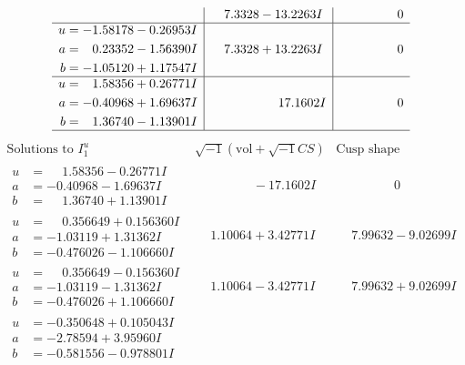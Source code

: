 \documentclass[1p]{elsarticle_modified}
\theoremstyle{definition}
\newcommand{\I}{\sqrt{-1}}
\begin{document}
$$\begin{array}{c|c|c}
 & \phantom{-}7.3328 - 13.2263 I & \phantom{-0.000000 } 0 \\ \hline\begin{aligned}
u &= -1.58178 - 0.26953 I \\
a &= \phantom{-}0.23352 - 1.56390 I \\
b &= -1.05120 + 1.17547 I\end{aligned}
 & \phantom{-}7.3328 + 13.2263 I & \phantom{-0.000000 } 0 \\ \hline\begin{aligned}
u &= \phantom{-}1.58356 + 0.26771 I \\
a &= -0.40968 + 1.69637 I \\
b &= \phantom{-}1.36740 - 1.13901 I\end{aligned}
 & \phantom{-0.000000 -}17.1602 I & \phantom{-0.000000 } 0\\
 \hline 
 \end{array}$$\newpage$$\begin{array}{c|c|c}  
\text{Solutions to }I^u_{1}& \I (\text{vol} + \sqrt{-1}CS) & \text{Cusp shape}\\
 \hline 
\begin{aligned}
u &= \phantom{-}1.58356 - 0.26771 I \\
a &= -0.40968 - 1.69637 I \\
b &= \phantom{-}1.36740 + 1.13901 I\end{aligned}
 & \phantom{-0.000000 } -17.1602 I & \phantom{-0.000000 } 0 \\ \hline\begin{aligned}
u &= \phantom{-}0.356649 + 0.156360 I \\
a &= -1.03119 + 1.31362 I \\
b &= -0.476026 - 1.106660 I\end{aligned}
 & \phantom{-}1.10064 + 3.42771 I & \phantom{-}7.99632 - 9.02699 I \\ \hline\begin{aligned}
u &= \phantom{-}0.356649 - 0.156360 I \\
a &= -1.03119 - 1.31362 I \\
b &= -0.476026 + 1.106660 I\end{aligned}
 & \phantom{-}1.10064 - 3.42771 I & \phantom{-}7.99632 + 9.02699 I \\ \hline\begin{aligned}
u &= -0.350648 + 0.105043 I \\
a &= -2.78594 + 3.95960 I \\
b &= -0.581556 - 0.978801 I\end{aligned}

\end{array}$$
\end{document}
